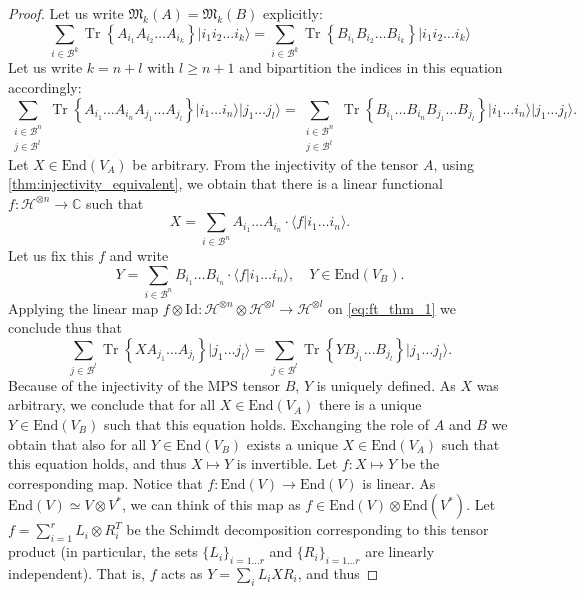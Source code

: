 \documentclass{article}
\newcommand{\tr}{\operatorname{Tr}}
\newcommand{\id}{\mathrm{Id}}
\newcommand{\End}{\mathrm{End}}
\newcommand{\ket}[1]{\vert #1 \rangle}
\newcommand{\scalprod}[2]{\langle #1 \vert #2 \rangle}
\begin{document}
\begin{proof}
  Let us write $\mathfrak{M}_k(A) = \mathfrak{M}_k(B)$ explicitly:
  \begin{equation*}
    \sum_{i\in \mathcal{B}^k} \tr\left\{A_{i_1} A_{i_2} \dots A_{i_k}\right\} \ket{i_1 i_2 \dots i_k} = 
    \sum_{i\in \mathcal{B}^k} \tr\left\{B_{i_1} B_{i_2} \dots B_{i_k}\right\} \ket{i_1 i_2 \dots i_k}
  \end{equation*}
  Let us write $k = n+l$ with $l\geq n+1$ and bipartition the indices in this equation accordingly:
  \begin{equation}\label{eq:ft_thm_1}
    \sum_{\substack{i\in \mathcal{B}^n\\j\in\mathcal{B}^l}} \tr\left\{A_{i_1} \dots A_{i_n} A_{j_1} \dots A_{j_l}\right\} \ket{i_1 \dots i_n} \ket{j_1 \dots j_l}= 
    \sum_{\substack{i\in \mathcal{B}^n\\j\in\mathcal{B}^l}} \tr\left\{B_{i_1} \dots B_{i_n} B_{j_1} \dots B_{j_l}\right\} \ket{i_1 \dots i_n} \ket{j_1 \dots j_l}.
  \end{equation}
  Let $X\in \End(V_A)$ be arbitrary. From the injectivity of the tensor $A$, using \cref{thm:injectivity_equivalent}, we obtain that there is a linear functional $f:\mathcal{H}^{\otimes n}\to \mathbb{C}$ such that 
  \begin{equation*}
    X = \sum_{i\in\mathcal{B}^n} A_{i_1} \dots A_{i_n} \cdot \scalprod{f}{i_1 \dots i_n}.
  \end{equation*}
  Let us fix this $f$ and write 
  \begin{equation*}
    Y = \sum_{i\in\mathcal{B}^n} B_{i_1} \dots B_{i_n} \cdot \scalprod{f}{i_1 \dots i_n}, \quad Y\in\End(V_B).
  \end{equation*}
  Applying the linear map $f\otimes\id: \mathcal{H}^{\otimes n} \otimes \mathcal{H}^{\otimes l} \to \mathcal{H}^{\otimes l}$ on \cref{eq:ft_thm_1} we conclude thus that
  \begin{equation*}
    \sum_{j\in\mathcal{B}^l} \tr\left\{X A_{j_1} \dots A_{j_l}\right\} \ket{j_1 \dots j_l}= 
    \sum_{j\in\mathcal{B}^l} \tr\left\{Y B_{j_1} \dots B_{j_l}\right\} \ket{j_1 \dots j_l}.
  \end{equation*}
  Because of the injectivity of the MPS tensor $B$, $Y$ is uniquely defined. As $X$ was arbitrary, we conclude that for all $X\in \End(V_A)$ there is a unique $Y\in \End(V_B)$ such that this equation holds. Exchanging the role of $A$ and $B$ we obtain that also for all $Y\in \End(V_B)$ exists a unique $X\in \End(V_A)$ such that this equation holds, and thus $X\mapsto Y$ is invertible. Let $f: X\mapsto Y$ be the corresponding map. Notice that $f: \End(V)\to \End(V)$ is linear. As $\End(V)\simeq V\otimes V^*$, we can think of this map as $f\in \End(V)\otimes \End(V^*)$. Let $f = \sum_{i=1}^r L_i \otimes R_i^T$ be the Schimdt decomposition corresponding to this tensor product (in particular, the sets $\{L_i\}_{i=1\dots r}$ and $\{R_i\}_{i=1\dots r}$ are linearly independent). That is, $f$ acts as $Y = \sum_i L_i X R_i$, and thus  

\end{proof}
\end{document}
